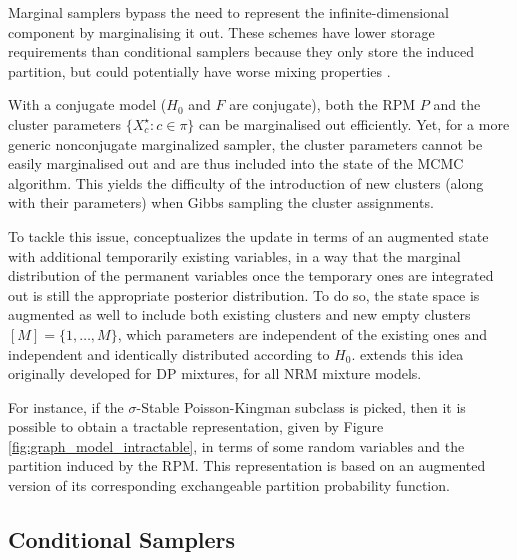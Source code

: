 Marginal samplers bypass the need to represent the infinite-dimensional component by marginalising it out. These schemes have lower storage requirements than conditional samplers because they only store the induced partition, but could potentially have worse mixing properties \cite{LomeliThesis}.

With a conjugate model ($H_0$ and $F$ are conjugate), both the \gls{RPM} $P$ and the cluster parameters $\{X_c^\star: c \in \pi \}$ can be marginalised out efficiently. Yet, for a more generic nonconjugate marginalized sampler, the cluster parameters cannot be easily marginalised out and are thus included into the state of the \gls{MCMC} algorithm. This yields the difficulty of the introduction of new clusters (along with their parameters) when Gibbs sampling the cluster assignments.

To tackle this issue, \cite{Neal:2000hb} conceptualizes the update in terms of an augmented state with additional temporarily existing variables, in a way that the marginal distribution of the permanent variables once the temporary ones are integrated out is still the appropriate posterior distribution.
To do so, the state space is augmented as well to include both existing clusters and new empty clusters $[M] = \{1, \dots , M\}$, which parameters are independent of the existing ones and independent and identically distributed according to $H_0$.
\cite{Favaro:2013fl} extends this idea originally developed for \gls{DP} mixtures, for all \gls{NRM} mixture models.

For instance, if the $\sigma$-Stable Poisson-Kingman subclass is picked, then it is possible to obtain a tractable representation, given by Figure \ref{fig:graph_model_intractable}, in terms of some random variables and the partition induced by the \gls{RPM}.
This representation is based on an augmented version of its corresponding exchangeable partition probability function.

\subsection{Conditional Samplers}

